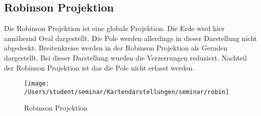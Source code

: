 \subsection{Robinson Projektion}
\label{sec:robinson}
Die Robinson Projektion ist eine globale Projektion. Die Erde wird hier annähernd Oval dargestellt. Die Pole werden allerdings in dieser Darstellung nicht abgedeckt. Breitenkreise werden in der Robinson Projektion als Geraden dargestellt. Bei dieser Darstellung wurden die Verzerrungen reduziert. Nachteil der Robinson Projektion ist das die Pole nicht erfasst werden.\\

\begin{figure}[hbtp]
\centering
\texttt{[image: /Users/student/seminar/Kartendarstellungen/seminar/robin]} \caption{Robinson Projektion}
\end{figure}
\newpage 